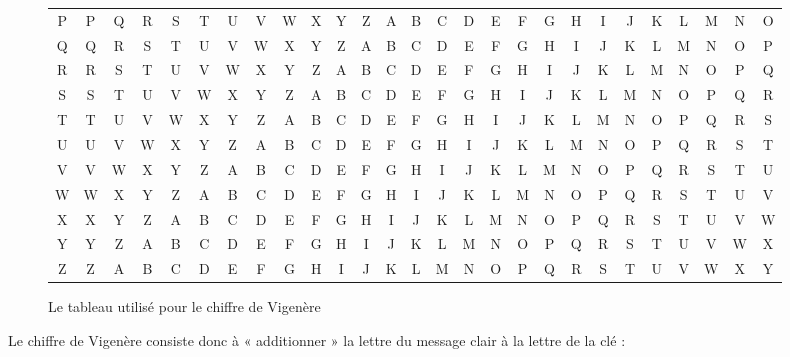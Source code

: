 \begin{figure}[h]
\begin{center}
\begin{tabular}{c|c@{}c@{}c@{}c@{}c@{}c@{}c@{}c@{}c@{}c@{}c@{}c@{}c@{}c@{}c@{}c@{}c@{}c@{}c@{}c@{}c@{}c@{}c@{}c@{}c@{}c}
      P & P & Q & R & S & T & U & V & W & X & Y & Z & A & B & C & D & E & F & G & H & I & J & K & L & M & N & O \\
      Q & Q & R & S & T & U & V & W & X & Y & Z & A & B & C & D & E & F & G & H & I & J & K & L & M & N & O & P \\
      R & R & S & T & U & V & W & X & Y & Z & A & B & C & D & E & F & G & H & I & J & K & L & M & N & O & P & Q \\
      S & S & T & U & V & W & X & Y & Z & A & B & C & D & E & F & G & H & I & J & K & L & M & N & O & P & Q & R \\
      T & T & U & V & W & X & Y & Z & A & B & C & D & E & F & G & H & I & J & K & L & M & N & O & P & Q & R & S \\
      U & U & V & W & X & Y & Z & A & B & C & D & E & F & G & H & I & J & K & L & M & N & O & P & Q & R & S & T \\
      V & V & W & X & Y & Z & A & B & C & D & E & F & G & H & I & J & K & L & M & N & O & P & Q & R & S & T & U \\
      W & W & X & Y & Z & A & B & C & D & E & F & G & H & I & J & K & L & M & N & O & P & Q & R & S & T & U & V \\
      X & X & Y & Z & A & B & C & D & E & F & G & H & I & J & K & L & M & N & O & P & Q & R & S & T & U & V & W \\
      Y & Y & Z & A & B & C & D & E & F & G & H & I & J & K & L & M & N & O & P & Q & R & S & T & U & V & W & X \\
      Z & Z & A & B & C & D & E & F & G & H & I & J & K & L & M & N & O & P & Q & R & S & T & U & V & W & X & Y \\
    \end{tabular}
  \end{center}
  \caption{Le tableau utilisé pour le chiffre de Vigenère}
  \label{fig:VigenereTableau}
\end{figure}

Le chiffre de Vigenère consiste donc à « additionner » la lettre du
message clair à la lettre de la clé : 

